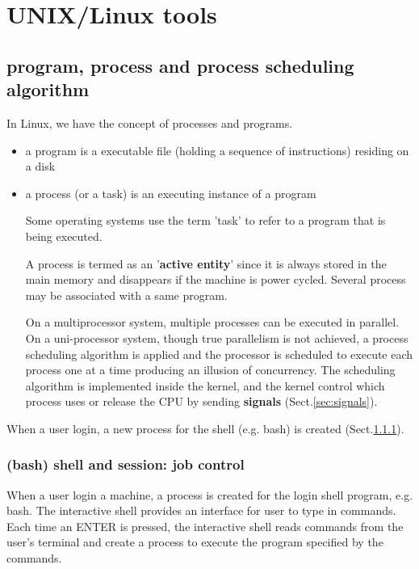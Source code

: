 \chapter{UNIX/Linux tools}
\label{sec:Unix_tools}

\section{program, process and process scheduling algorithm}
\label{sec:shell-process}
\label{sec:process}

In Linux, we have the concept of processes and programs. 
\begin{itemize}
  \item a program is a executable file (holding a sequence of instructions)
  residing on a disk
  
  \item a process (or a task) is an executing instance of a program
  
  Some operating systems use the term 'task' to refer to a program that is
  being executed.
  
  A process is termed as an '{\bf active entity}' since it is always stored in
  the main memory and disappears if the machine is power cycled. Several process
  may be associated with a same program.
  
  On a multiprocessor system, multiple processes can be executed in parallel. On
  a uni-processor system, though true parallelism is not achieved, a process
  scheduling algorithm is applied and the processor is scheduled to execute each
  process one at a time producing an illusion of concurrency.
  The scheduling algorithm is implemented inside the kernel, and the kernel
  control which process uses or release the CPU by sending {\bf signals}
  (Sect.\ref{sec:signals}).
  
\end{itemize}

When a user login, a new process for the shell (e.g. bash) is created
(Sect.\ref{sec:session_job-control}). 

\subsection{(bash) shell and session: job control}
\label{sec:session_job-control}

When a user login a machine, a process is created for the login shell program,
e.g. bash. The interactive shell provides an interface for user to type in
commands. Each time an ENTER is pressed, the interactive shell reads commands
from the user's terminal and create a process to execute the program specified by the
commands.

